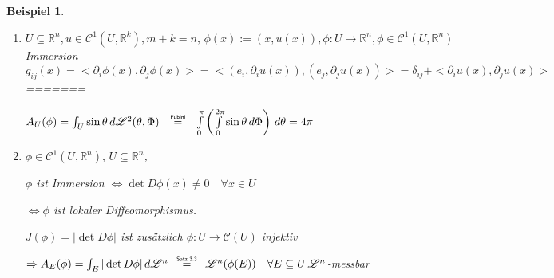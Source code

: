 \documentclass[11pt]{memoir}
\theoremstyle{changebreak}
\newtheorem{Beispiel}{Beispiel}[chapter]
\newcommand\overequal[1]{\mathrel{\overset{\makebox[0pt]{\mbox{\normalfont\tiny\sffamily $ #1 $}}}{=}}}
\begin{document}
\begin{Beispiel}
\begin{enumerate}
<<<<<<< Updated upstream

	$A_U(\phi) = \int_U \sin\theta\,d\mathscr L^2(\theta, \Phi) \overequal{\text{Fubini}} \int\limits_0^\pi \left( \int\limits_0^{2\pi} \sin\theta \, d\Phi\right) \,d\theta = 4 \pi$
	\
	item $\phi \in \mathscr C^1(U, \mathbb R^n), U \subseteq \mathbb R^n, \phi$ ist Immersion $\Leftrightarrow \det D\phi(x) \ne 0 \, \forall x \in U \Leftrightarrow \phi$ ist lokaler Diffeomorphismus. \\
	$J(\phi)= |\det D\phi|$ ist zusätzlcih $\phi: U \rightarrow \mathscr C(U)$ injektiv \\
	$\Rightarrow A_E (\phi) = \int_E |\det D\phi|\, d\mathscr L^n \overequal{\text{Satz 3.3}} \mathscr L^n(\phi(E)) \, \forall E \subseteq U \, \mathscr L^n$-messbar

	\item $U \subseteq \mathbb R^n, u \in \mathscr C^1(U, \mathbb R^k), m+k =n,\, \phi(x) := (x, u(x)), \phi: U \rightarrow \mathbb R^n, \phi \in \mathscr C^1(U, \mathbb R^n)$ Immersion \\
	$g_{ij}(x) = <\partial_i \phi(x), \partial_j \phi(x)> = <(e_i, \partial_i u(x)), (e_j, \partial_j u(x))> =
	\delta_{ij} + <\partial_i u(x), \partial_j u(x)> $ \\
=======
	
	$A_U(\phi) = \int_U \sin\theta\,d\mathscr L^2(\theta, \Phi) \quad \overequal{\text{Fubini}} \quad \int\limits_0^\pi \left( \int\limits_0^{2\pi} \sin\theta \, d\Phi\right) \,d\theta = 4 \pi$
	
	\item $\phi \in \mathscr C^1(U, \mathbb R^n), \, U \subseteq \mathbb R^n$, 
	\par
	$\phi$ ist Immersion $\Leftrightarrow \det D\phi(x) \ne 0 \quad \forall x \in U$
	\par
	$\Leftrightarrow \phi$ ist lokaler Diffeomorphismus. 
	\par
	$J(\phi)= |\det D\phi|$ ist zusätzlich $\phi: U \rightarrow \mathscr C(U)$ injektiv 
	\par
	$\Rightarrow A_E (\phi) = \int_E |\det D\phi|\, d\mathscr L^n \quad \overequal{\text{Satz 3.3}} \quad \mathscr L^n(\phi(E)) \quad \forall E \subseteq U \, \mathscr L^n$-messbar
	

\end{enumerate}
\end{Beispiel}
\end{document}
